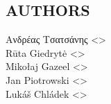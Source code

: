 \documentclass[a4paper,english]{article}
\begin{document}
\begin{adjustwidth}{18pt}{0pt}


    \section{AUTHORS}
    Ανδρέας Τσατσάνης <>\\[0.1cm]\MANbr
    Rūta Giedrytė <>\\[0.1cm]\MANbr
    Mikołaj Gazeel <>\\[0.1cm]\MANbr
    Jan Piotrowski <>\\[0.1cm]\MANbr
    Lukáš Chládek <>\\[0.1cm]\MANbr
\end{adjustwidth}
\end{document}
